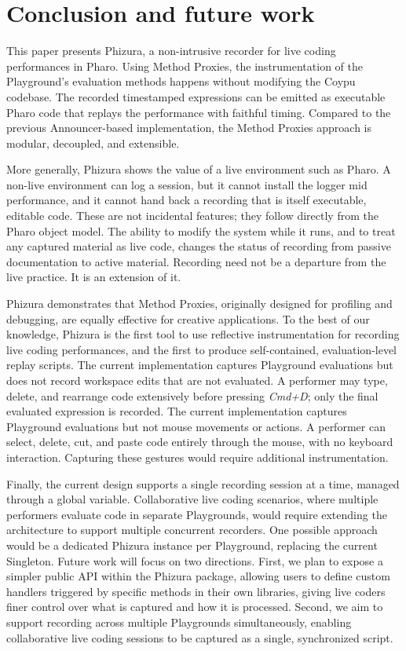 \documentclass[
]{ceurart}
\begin{document}
\section{Conclusion and future work}

This paper presents Phizura, a non-intrusive recorder for live coding performances in Pharo. Using Method Proxies, the instrumentation of the Playground's evaluation methods happens without modifying the Coypu codebase. The recorded timestamped expressions can be emitted as executable Pharo code that replays the performance with faithful timing. Compared to the previous Announcer-based implementation, the Method Proxies approach is modular, decoupled, and extensible.

More generally, Phizura shows the value of a live environment such as Pharo. A non-live environment can log a session, but it cannot install the logger mid performance, and it cannot hand back a recording that is itself executable, editable code. These are not incidental features; they follow directly from the Pharo object model. The ability to modify the system while it runs, and to treat any captured material as live code, changes the status of recording from passive documentation to active material. Recording need not be a departure from the live practice. It is an extension of it.

Phizura demonstrates that Method Proxies, originally designed for profiling and debugging, are equally effective for creative applications. To the best of our knowledge, Phizura is the first tool to use reflective instrumentation for recording live coding performances, and the first to produce self-contained, evaluation-level replay scripts.
The current implementation captures Playground evaluations but does not record workspace edits that are not evaluated.
A performer may type, delete, and rearrange code extensively before pressing \textit{Cmd+D}; only the final evaluated expression is recorded.
The current implementation captures Playground evaluations but not mouse movements or actions. A performer can select, delete, cut, and paste code entirely through the mouse, with no keyboard interaction. Capturing these gestures would require additional instrumentation.


Finally, the current design supports a single recording session at a time, managed through a global variable. Collaborative live coding scenarios, where multiple performers evaluate code in separate Playgrounds, would require extending the architecture to support multiple concurrent recorders. One possible approach would be a dedicated Phizura instance per Playground, replacing the current Singleton.
Future work will focus on two directions. First, we plan to expose a simpler public API within the Phizura package, allowing users to define custom handlers triggered by specific methods in their own libraries, giving live coders finer control over what is captured and how it is processed. Second, we aim to support recording across multiple Playgrounds simultaneously, enabling collaborative live coding sessions to be captured as a single, synchronized script.




\appendix
\end{document}
